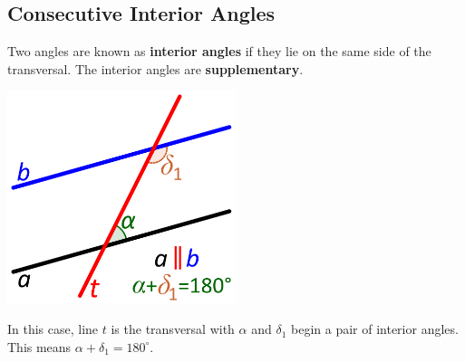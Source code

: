\documentclass[12pt,a4paper]{article}
\begin{document}
\subsection{Consecutive Interior Angles}
Two angles are known as {\bf interior angles}
if they lie on the same side of the transversal.
The interior angles are {\bf supplementary}. 
\begin{center}
\includegraphics[width=0.5\textwidth]{int.png}
\end{center}
In this case, line \(t\) is the transversal with
\(\alpha\) and \(\delta_1\) begin a pair of 
interior angles. This means \(\alpha+\delta_1=180^\circ\).
\end{document}
